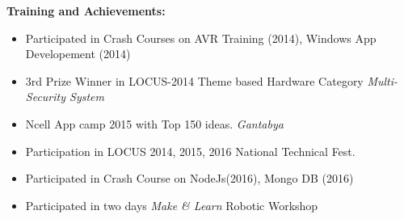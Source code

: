 \documentclass[a4paper, 12pt]{article}
\begin{document}
\vspace{8mm}
{\Large \textbf{ Training and Achievements: }\\ }
\vspace{-5mm}
\begin{itemize}
	\item  Participated in Crash Courses on AVR Training (2014), Windows 
	App Developement (2014)
	\item 3rd Prize Winner in LOCUS-2014 Theme based Hardware Category 
	\emph{Multi-Security System}
	\item Ncell App camp 2015 with Top 150 ideas. \emph{Gantabya}
	\item Participation in LOCUS 2014, 2015, 2016 National Technical Fest. 
	\item Participated in Crash Course on NodeJs(2016), Mongo DB (2016) 
	\item Participated in two days \emph{Make \& Learn } Robotic Workshop
\end{itemize}
\end{document}
